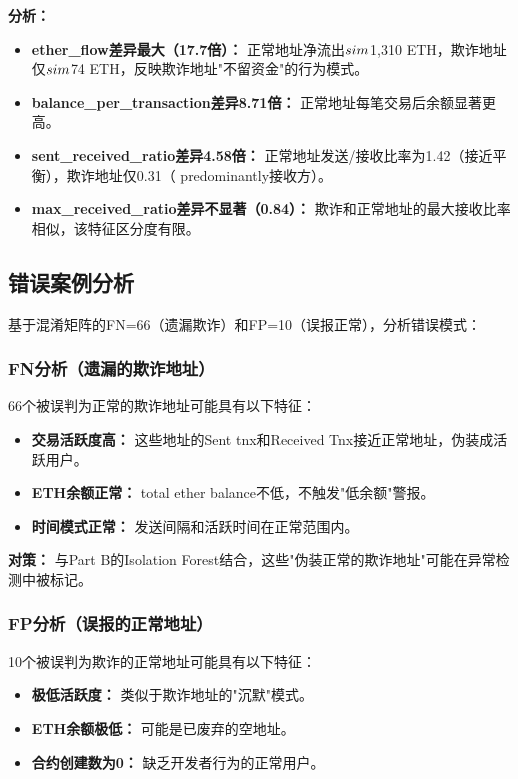 \documentclass[12pt,a4paper]{article}
\begin{document}
\textbf{分析：}
\begin{itemize}
    \item \textbf{ether\_flow差异最大（17.7倍）：} 正常地址净流出$\\sim$1{,}310 ETH，欺诈地址仅$\\sim$74 ETH，反映欺诈地址"不留资金"的行为模式。
    \item \textbf{balance\_per\_transaction差异8.71倍：} 正常地址每笔交易后余额显著更高。
    \item \textbf{sent\_received\_ratio差异4.58倍：} 正常地址发送/接收比率为1.42（接近平衡），欺诈地址仅0.31（ predominantly接收方）。
    \item \textbf{max\_received\_ratio差异不显著（0.84）：} 欺诈和正常地址的最大接收比率相似，该特征区分度有限。
\end{itemize}

\subsection{错误案例分析}

基于混淆矩阵的FN=66（遗漏欺诈）和FP=10（误报正常），分析错误模式：

\subsubsection{FN分析（遗漏的欺诈地址）}

66个被误判为正常的欺诈地址可能具有以下特征：
\begin{itemize}
    \item \textbf{交易活跃度高：} 这些地址的Sent tnx和Received Tnx接近正常地址，伪装成活跃用户。
    \item \textbf{ETH余额正常：} total ether balance不低，不触发"低余额"警报。
    \item \textbf{时间模式正常：} 发送间隔和活跃时间在正常范围内。
\end{itemize}

\textbf{对策：} 与Part B的Isolation Forest结合，这些"伪装正常的欺诈地址"可能在异常检测中被标记。

\subsubsection{FP分析（误报的正常地址）}

10个被误判为欺诈的正常地址可能具有以下特征：
\begin{itemize}
    \item \textbf{极低活跃度：} 类似于欺诈地址的"沉默"模式。
    \item \textbf{ETH余额极低：} 可能是已废弃的空地址。
    \item \textbf{合约创建数为0：} 缺乏开发者行为的正常用户。
\end{itemize}
\end{document}
